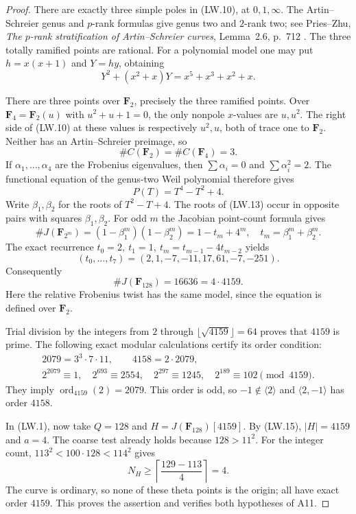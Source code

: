 \documentclass[11pt,a4paper]{article}
\begin{document}
\begin{proof}
There are exactly three simple poles in (LW.10), at $0,1,\infty$.
The Artin--Schreier genus and $p$-rank formulas give genus two and
$2$-rank two; see Pries--Zhu,
\emph{The $p$-rank stratification of Artin--Schreier curves},
Lemma~2.6, p.~712 \cite{PriesZhu2012}.  The three totally ramified points are rational.
For a polynomial model one may put $h=x(x+1)$ and $Y=hy$, obtaining
\[
               Y^2+(x^2+x)Y=x^5+x^3+x^2+x.
 \tag{LW.11}
\]

There are three points over $\mathbf F_2$, precisely the three
ramified points.  Over
$\mathbf F_4=\mathbf F_2(u)$ with $u^2+u+1=0$, the only nonpole
$x$-values are $u,u^2$.  The right side of (LW.10) at these
values is respectively $u^2,u$, both of trace one to $\mathbf F_2$.
Neither has an Artin--Schreier preimage, so
\[
                      \#C(\mathbf F_2)=\#C(\mathbf F_4)=3.
 \tag{LW.12}
\]
If $\alpha_1,\ldots,\alpha_4$ are the Frobenius eigenvalues, then
$\sum\alpha_i=0$ and $\sum\alpha_i^2=2$.
The functional equation of the genus-two Weil polynomial
therefore gives
\[
                          P(T)=T^4-T^2+4.
 \tag{LW.13}
\]
Write $\beta_1,\beta_2$ for the roots of $T^2-T+4$.
The roots of (LW.13) occur in opposite pairs with squares
$\beta_1,\beta_2$.  For odd $m$ the Jacobian point-count formula
\cite[Theorem~19.1(b)]{MilneAV} gives
\[
 \#J(\mathbf F_{2^m})=(1-\beta_1^m)(1-\beta_2^m)
                   =1-t_m+4^m,
 \quad t_m=\beta_1^m+\beta_2^m.
 \tag{LW.14}
\]
The exact recurrence
$t_0=2,\ t_1=1,\ t_m=t_{m-1}-4t_{m-2}$ yields
\[
                  (t_0,\ldots,t_7)=(2,1,-7,-11,17,61,-7,-251).
\]
Consequently
\[
                    \#J(\mathbf F_{128})=16636=4\cdot4159.
 \tag{LW.15}
\]
Here the relative Frobenius twist has the same model, since the
equation is defined over $\mathbf F_2$.

Trial division by the integers from $2$ through
$\lfloor\sqrt{4159}\rfloor=64$ proves that $4159$ is prime.
The following exact modular calculations certify its order condition:
\[
\begin{gathered}
 2079=3^3\cdot7\cdot11,\qquad 4158=2\cdot2079,\\
 2^{2079}\equiv1,\quad
 2^{693}\equiv2554,\quad
 2^{297}\equiv1245,\quad
 2^{189}\equiv102\pmod{4159}.
\end{gathered}
 \tag{LW.16}
\]
They imply $\operatorname{ord}_{4159}(2)=2079$.
This order is odd, so $-1\notin\langle2\rangle$ and
$\langle2,-1\rangle$ has order $4158$.

In (LW.1), now take $Q=128$ and
$H=J(\mathbf F_{128})[4159]$.  By (LW.15), $|H|=4159$ and $a=4$.
The coarse test already holds because $128>11^2$.
For the integer count,
$113^2<100\cdot128<114^2$ gives
\[
       N_H\ge\left\lceil\frac{129-113}{4}\right\rceil=4.
 \tag{LW.17}
\]
The curve is ordinary, so none of these theta points is the origin;
all have exact order $4159$.  This proves the assertion and
verifies both hypotheses of A11.
\end{proof}
\end{document}
